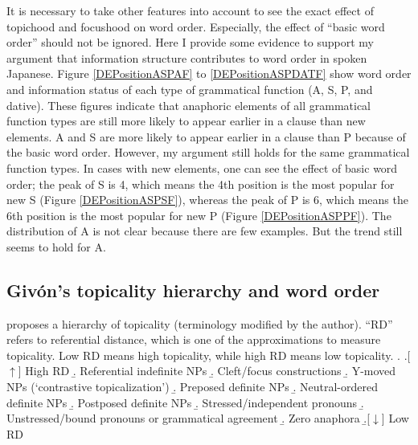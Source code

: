 It is necessary to take other features into account
to see the exact effect of topichood and focushood on word order.%
Especially, the effect of ``basic word order'' should not be ignored.
Here I provide some evidence to support my argument that
information structure contributes to word order in spoken Japanese.
Figure \ref{DEPositionASPAF} to \ref{DEPositionASPDATF} show
word order and information status of each type of grammatical function (A, S, P, and dative).
These figures indicate that
anaphoric elements of all grammatical function types are still more likely to appear earlier in a clause than new elements.
A and S are more likely to appear earlier in a clause than P because of the basic word order.
However, my argument still holds for the same grammatical function types.
In cases with new elements,
one can see the effect of basic word order;
the peak of S is 4,
which means the 4th position is the most popular for new S (Figure \ref{DEPositionASPSF}),
whereas the peak of P is 6, which means the 6th position is the most popular for new P (Figure \ref{DEPositionASPPF}).
The distribution of A is not clear because there are few examples.
But the trend still seems to hold for A.

\subsection{Giv\'on's topicality hierarchy and word order}\label{WO:Dis:Givon}

 proposes a hierarchy of topicality \Next (terminology modified by the author).
``RD'' refers to referential distance,
which is one of the approximations to measure topicality.
Low RD means high topicality,
while high RD means low topicality.
%
\ex.\label{TopicHierarchy}
 \a.[$\uparrow$] High RD
 \b. Referential indefinite NPs
 \b. Cleft/focus constructions
 \b. Y-moved NPs (`contrastive topicalization')
 \b. Preposed definite NPs
 \b. Neutral-ordered definite NPs
 \b. Postposed definite NPs
 \b. Stressed/independent pronouns
 \b. Unstressed/bound pronouns or grammatical agreement
 \b. Zero anaphora
 \b.[$\downarrow$] Low RD
 \hfill{\cite[][7]{givon83}}

